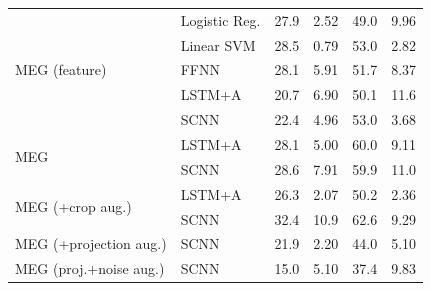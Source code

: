 \documentclass[fleqn,10pt]{wlscirep}
\begin{document}
\begin{table}[htp]
{\begin{tabular}{l l| c | c | c | c}
    \midrule
    \multirow{5}{*}{MEG (feature)}
                     & Logistic Reg.        & 27.9 & 2.52  & 49.0 & 9.96 \\
                     & Linear SVM          & 28.5 & 0.79  & 53.0 & 2.82 \\
                     & FFNN                & 28.1 & 5.91  & 51.7 & 8.37 \\
                     & LSTM+A              & 20.7 & 6.90  & 50.1 & 11.6 \\
                     & SCNN                & 22.4 & 4.96  & 53.0 & 3.68 \\
    \midrule
    \multirow{2}{*}{MEG}
                         & LSTM+A              & 28.1 & 5.00 & 60.0 & 9.11 \\ 
                         & SCNN                & 28.6 & 7.91 & 59.9 & 11.0 \\
    \midrule
    \multirow{2}{*}{MEG (+crop aug.)}
                         & LSTM+A              & 26.3 & 2.07 & 50.2 & 2.36 \\ 
                         & SCNN                & 32.4 & 10.9 & 62.6 & 9.29 \\
    \midrule
    \multirow{1}{*}{MEG (+projection aug.)}
                         & SCNN                & 21.9 & 2.20 & 44.0 & 5.10 \\
    \midrule
    \multirow{1}{*}{MEG (proj.+noise aug.)}
                         & SCNN                & 15.0 & 5.10 & 37.4 & 9.83 \\
    \bottomrule
  \end{tabular}}
  \label{tab:seven_way_results}
\end{table}
\end{document}
